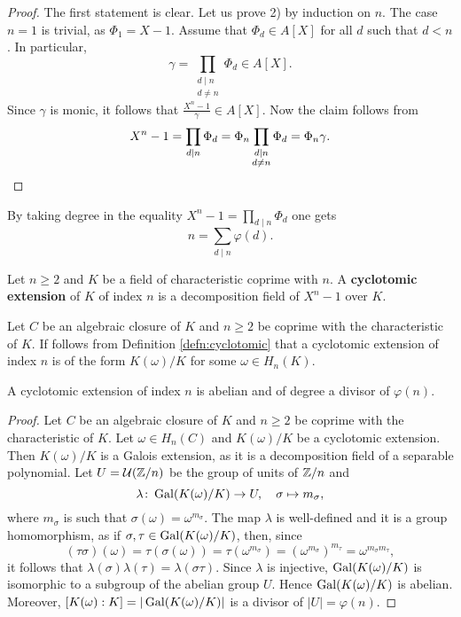 \begin{proof}
    The first statement is clear. Let us prove 2) by induction on $n$. The case $n=1$ is
    trivial, as $\Phi_1=X-1$. Assume that $\Phi_d\in A[X]$ for all $d$ such that $d<n$. 
    In particular,
    \[
    \gamma=\prod_{\substack{d\mid n\\d\ne n}}\Phi_d\in A[X].
    \]
    Since $\gamma$ is monic, it follows that 
    $\frac{X^n-1}{\gamma}\in A[X]$. Now the claim follows from 
    \[
    X^n-1=\prod_{d\mid n}\Phi_d=\Phi_n\prod_{\substack{d\mid n\\d\ne n}}\Phi_d=\Phi_n\gamma.\qedhere
    \]
\end{proof}

By taking degree in the equality 
$X^n-1=\prod_{d\mid n}\Phi_d$ 
one gets 
\[
n=\sum_{d\mid n}\varphi(d).
\]

\begin{definition}
\label{defn:cyclotomic}
    Let $n\geq2$ and $K$ be a field of characteristic coprime with $n$. A 
    \textbf{cyclotomic extension} of $K$ of index $n$ is a 
    decomposition field of $X^n-1$ over $K$. 
\end{definition}

Let $C$ be an algebraic closure of $K$ and $n\geq2$ be coprime with the characteristic of $K$. 
If follows from Definition \ref{defn:cyclotomic} 
that a cyclotomic extension of index $n$ is of the form 
$K(\omega)/K$ for some $\omega\in H_n(K)$. 

\begin{proposition}
    A cyclotomic extension of index $n$ is abelian and of degree a divisor of $\varphi(n)$. 
\end{proposition}

\begin{proof}
    Let $C$ be an algebraic closure of $K$ and $n\geq2$ be coprime with the characteristic of $K$. 
    Let $\omega\in H_n(C)$ and $K(\omega)/K$ be a cyclotomic extension. Then $K(\omega)/K$
    is a Galois extension, as it is a decomposition field of a separable polynomial. 
    Let $U=\mathcal{U}(\mathbb{Z}/n)$ be the group of units of $\mathbb{Z}/n$ and 
    \[
    \lambda\colon \operatorname{Gal}(K(\omega)/K)\to U,
    \quad
    \sigma\mapsto m_{\sigma},
    \]
    where $m_{\sigma}$ is such that $\sigma(\omega)=\omega^{m_{\sigma}}$. The map $\lambda$ is well-defined and
    it is a group homomorphism, as if $\sigma,\tau\in\operatorname{Gal}(K(\omega)/K)$, then, since 
    \[
        (\tau\sigma)(\omega)=\tau(\sigma(\omega))=\tau(\omega^{m_\sigma})=\left(\omega^{m_\sigma}\right)^{m_\tau}=\omega^{m_\sigma m_\tau},
    \]
    it follows that $\lambda(\sigma)\lambda(\tau)=\lambda(\sigma\tau)$. Since 
    $\lambda$ is injective, $\operatorname{Gal}(K(\omega)/K)$ is isomorphic to a subgroup 
    of the abelian group $U$. Hence $\operatorname{Gal}(K(\omega)/K)$ is abelian. Moreover, 
    $[K(\omega):K]=|\operatorname{Gal}(K(\omega)/K)|$ is a divisor of $|U|=\varphi(n)$. 
\end{proof}

